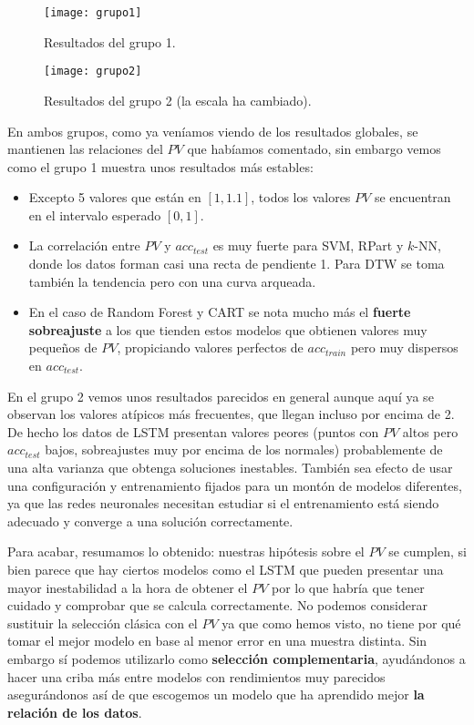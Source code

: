 \begin{figure}[htbp]
  \centering
  \hspace*{-1cm}
  \texttt{[image: grupo1]}
  \caption{Resultados del grupo 1.}
  \label{fig:pv-grupo1}
\end{figure}

\begin{figure}[htbp]
  \centering
  \hspace*{-1cm}
  \texttt{[image: grupo2]}
  \caption{Resultados del grupo 2 (la escala ha cambiado).}
  \label{fig:pv-grupo2}
\end{figure}

En ambos grupos, como ya veníamos viendo de los resultados globales, se mantienen las relaciones del $PV$ que habíamos comentado, sin embargo vemos como el grupo 1 muestra unos resultados más estables:

\begin{itemize}
  \item Excepto 5 valores que están en $[1, 1.1]$, todos los valores $PV$ se encuentran en el intervalo esperado $[0,1]$.
  \item La correlación entre $PV$ y $acc_{test}$ es muy fuerte para SVM, RPart y $k$-NN, donde los datos forman casi una recta de pendiente 1. Para DTW se toma también la tendencia pero con una curva arqueada.
  \item En el caso de Random Forest y CART se nota mucho más el \textbf{fuerte sobreajuste} a los que tienden estos modelos que obtienen valores muy pequeños de $PV$, propiciando valores perfectos de $acc_{train}$ pero muy dispersos en $acc_{test}$.
\end{itemize}

En el grupo 2 vemos unos resultados parecidos en general aunque aquí ya se observan los valores atípicos más frecuentes, que llegan incluso por encima de 2. De hecho los datos de LSTM presentan valores peores (puntos con $PV$ altos pero $acc_{test}$ bajos, sobreajustes muy por encima de los normales) probablemente de una alta varianza que obtenga soluciones inestables. También sea efecto de usar una configuración y entrenamiento fijados para un montón de modelos diferentes, ya que las redes neuronales necesitan estudiar si el entrenamiento está siendo adecuado y converge a una solución correctamente.

Para acabar, resumamos lo obtenido: nuestras hipótesis sobre el $PV$ se cumplen, si bien parece que hay ciertos modelos como el LSTM que pueden presentar una mayor inestabilidad a la hora de obtener el $PV$ por lo que habría que tener cuidado y comprobar que se calcula correctamente. No podemos considerar sustituir la selección clásica con el $PV$ ya que como hemos visto, no tiene por qué tomar el mejor modelo en base al menor error en una muestra distinta. Sin embargo sí podemos utilizarlo como \textbf{selección complementaria}, ayudándonos a hacer una criba más entre modelos con rendimientos muy parecidos asegurándonos así de que escogemos un modelo que ha aprendido mejor \textbf{la relación de los datos}.

